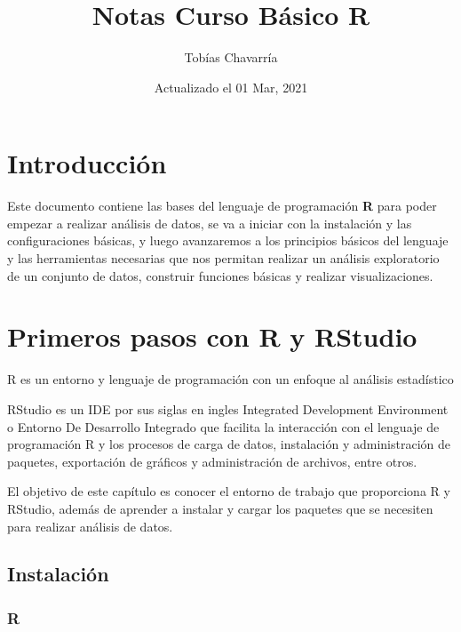 \documentclass[
  12pt,
]{book}
\title{Notas Curso Básico R}
\author{Tobías Chavarría}
\date{Actualizado el 01 Mar, 2021}
\begin{document}
\maketitle

{
\hypersetup{linkcolor=}
\setcounter{tocdepth}{4}
\tableofcontents
}
\hypertarget{introducciuxf3n}{%
\chapter{Introducción}\label{introducciuxf3n}}

Este documento contiene las bases del lenguaje de programación \textbf{R} para poder
empezar a realizar análisis de datos, se va a iniciar con la instalación y las
configuraciones básicas, y luego avanzaremos a los principios básicos del
lenguaje y las herramientas necesarias que nos permitan realizar un análisis
exploratorio de un conjunto de datos, construir funciones básicas y realizar visualizaciones.

\hypertarget{primeros-pasos-con-r-y-rstudio}{%
\chapter{\texorpdfstring{\textbf{Primeros pasos con R y RStudio}}{Primeros pasos con R y RStudio}}\label{primeros-pasos-con-r-y-rstudio}}

R es un entorno y lenguaje de programación con un enfoque al análisis estadístico

RStudio es un IDE por sus siglas en ingles Integrated Development Environment o Entorno De Desarrollo Integrado que facilita la interacción con el lenguaje de programación R y los procesos de carga de datos, instalación y administración de paquetes, exportación de gráficos y administración de archivos, entre otros.

El objetivo de este capítulo es conocer el entorno de trabajo que proporciona R y RStudio, además de aprender a instalar y cargar los paquetes que se necesiten para realizar análisis de datos.

\hypertarget{instalaciuxf3n}{%
\section{\texorpdfstring{\textbf{Instalación}}{Instalación}}\label{instalaciuxf3n}}

\hypertarget{r}{%
\subsection{\texorpdfstring{\textbf{R}}{R}}\label{r}}
\end{document}
